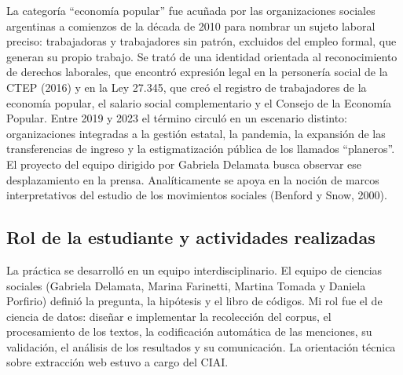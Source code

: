 \documentclass[11pt,a4paper]{article}
\newcommand{\EP}{economía popular}
\begin{document}
La categoría \enquote{\EP} fue acuñada por las organizaciones sociales argentinas a comienzos de la década de 2010 para nombrar un sujeto laboral preciso: trabajadoras y trabajadores sin patrón, excluidos del empleo formal, que generan su propio trabajo. Se trató de una identidad orientada al reconocimiento de derechos laborales, que encontró expresión legal en la personería social de la CTEP (2016) y en la Ley 27.345, que creó el registro de trabajadores de la economía popular, el salario social complementario y el Consejo de la Economía Popular. Entre 2019 y 2023 el término circuló en un escenario distinto: organizaciones integradas a la gestión estatal, la pandemia, la expansión de las transferencias de ingreso y la estigmatización pública de los llamados \enquote{planeros}. El proyecto del equipo dirigido por Gabriela Delamata busca observar ese desplazamiento en la prensa. Analíticamente se apoya en la noción de marcos interpretativos del estudio de los movimientos sociales (Benford y Snow, 2000).

\subsection{Rol de la estudiante y actividades realizadas}

La práctica se desarrolló en un equipo interdisciplinario. El equipo de ciencias sociales (Gabriela Delamata, Marina Farinetti, Martina Tomada y Daniela Porfirio) definió la pregunta, la hipótesis y el libro de códigos. Mi rol fue el de ciencia de datos: diseñar e implementar la recolección del corpus, el procesamiento de los textos, la codificación automática de las menciones, su validación, el análisis de los resultados y su comunicación. La orientación técnica sobre extracción web estuvo a cargo del CIAI.
\end{document}
